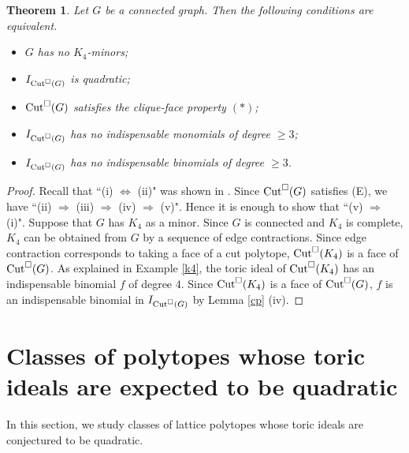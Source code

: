 \documentclass[12pt]{amsart}
\newtheorem{thm}{Theorem} [section]
\theoremstyle{definition}
\numberwithin{thm}{section}
\numberwithin{equation}{section}
\begin{document}
\begin{thm}
    Let $G$ be a connected graph.
    Then the following conditions are equivalent.
    \begin{itemize}
        \item[{\rm (i)}] 
        $G$ has no $K_4$-minors{\rm ;}
    
        \item[{\rm (ii)}] 
        $I_{{\rm Cut}^\Box(G)}$ is quadratic{\rm ;}

        \item[{\rm (iii)}] 
        ${\rm Cut}^\Box(G)$ satisfies the clique-face property $(*)${\rm ;}

        
        \item[{\rm (iv)}] 
        $I_{{\rm Cut}^\Box(G)}$ has no indispensable monomials of degree $\ge 3${\rm ;}

        \item[{\rm (v)}] 
        $I_{{\rm Cut}^\Box(G)}$ has no indispensable binomials of degree $\ge 3$.
        
    \end{itemize}
\end{thm}

\begin{proof}
Recall that ``(i) $\Leftrightarrow$ (ii)" was shown in \cite{Eng}.
    Since ${\rm Cut}^\Box(G)$ satisfies (E), we have
    ``(ii) $\Rightarrow $ (iii) $\Rightarrow $ (iv) $\Rightarrow $ (v)".
Hence 
it is enough to show that ``(v) $\Rightarrow $ (i)".
Suppose that $G$ has $K_4$ as a minor.
Since $G$ is connected and $K_4$ is complete, $K_4$ can be obtained from $G$ by a sequence of edge contractions. 
Since edge contraction corresponds to taking a face of a cut polytope, ${\rm Cut}^\Box(K_4)$ is a face of ${\rm Cut}^\Box(G)$.
As explained in Example \ref{k4},  
the toric ideal of ${\rm Cut}^\Box(K_4)$ has an indispensable binomial $f$ of degree $4$.
Since
${\rm Cut}^\Box(K_4)$ is a face of ${\rm Cut}^\Box(G)$, $f$ is an indispensable binomial in $I_{{\rm Cut}^\Box(G)}$ by Lemma \ref{cp} (iv).
\end{proof}



\section{Classes of polytopes whose toric ideals are expected to be quadratic}


In this section, we study classes of lattice polytopes whose toric ideals are conjectured to be quadratic.
\end{document}
